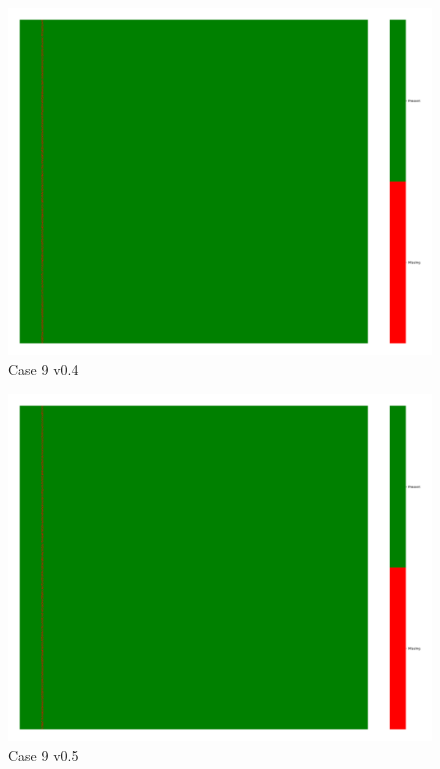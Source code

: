 \documentclass[a4paper,12pt]{article}
\begin{document}
\begin{figure}[H]
    \includegraphics[width=\linewidth]{case10_v0.4_heatmap_cleaned.png}
    \caption*{Case 9 v0.4}
\end{figure}

\begin{figure}[H]
    \includegraphics[width=\linewidth]{case10_v0.5_heatmap_cleaned.png}
    \caption*{Case 9 v0.5}
\end{figure}
\end{document}
